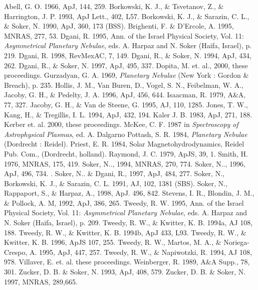 \begin{references}
 Abell, G. O. 1966, ApJ, 144, 259.
 Borkowski, K. J., \& Tsvetanov, Z., \& Harrington, J. P. 1993,
ApJ Lett., 402, L57.
 Borkowski, K. J., \& Sarazin, C. L., \& Soker, N. 1990,
ApJ, 360, 173 (BSS).
 Brighenti, F. \& D'Ercole, A. 1995, MNRAS, 277, 53.
 Dgani, R. 1995,
Ann. of the Israel Physical Society, Vol. 11:
{\it Asymmetrical Planetary Nebulae},
eds. A. Harpaz and N. Soker (Haifa, Israel), p. 219.
 Dgani, R. 1998, RevMexAC, 7, 149.
 Dgani, R.,  \& Soker, N. 1994, ApJ, 434, 262.
 Dgani, R.,  \& Soker, N. 1997, ApJ, 495, 337.
 Dopita, M. et. al., 2000, these proceedings.
 Gurzadyan, G. A. 1969, {\it Planetary Nebulae} 
(New York : Gordon \& Breach), p. 235.
 Hollis, J. M., Van Buren, D., Vogel, S. N., Feibelman, W. A.,
     Jacoby, G. H., \& Pedelty, J. A. 1996, ApJ, 456, 644.
 Isaacman,  R. 1979, A\&A, 77, 327.
 Jacoby, G. H., \& Van de Steene, G. 1995, AJ, 110, 1285.
 Jones, T. W., Kang, H., \& Tregillis, I. L. 1994,
ApJ, 432, 194.
 Kaler J. B. 1983, ApJ, 271, 188.
 Kerber et. al. 2000, these proceedings.
 McKee, C. F. 1987 in {\it Spectroscopy of Astrophysical
 Plasmas}, ed. A. Dalgarno
 Pottash, S. R. 1984,  {\it Planetary Nebulae} (Dordrecht : Reidel).
 Priest, E. R. 1984, Solar Magnetohydrodynamics,
Reidel Pub. Com., (Dordrecht, holland).
 Raymond,  J. C.  1979, ApJS, 39, 1.
 Smith, H.  1976, MNRAS, 175, 419.
 Soker, N.., 1994, MNRAS, 270, 774.
 Soker, N.., 1996, ApJ, 496, 734. .
 Soker, N.. \&   Dgani, R., 1997, ApJ, 484, 277.
 Soker, N., Borkowski, K. J., \& Sarazin, C. L. 1991, AJ, 102, 1381 (SBS).
 Soker, N., Rappaport, S., \& Harpaz, A., 1998, ApJ. 496, 842.
 Stevens, I. R., Blondin, J. M., \& Pollock, A. M, 1992, ApJ, 386, 265.
 Tweedy, R. W. 1995,
Ann. of the Israel Physical Society, Vol. 11:
{\it Asymmetrical Planetary Nebulae},
eds. A. Harpaz and N. Soker (Haifa, Israel), p. 209.
 Tweedy, R. W., \& Kwitter, K. B. 1994a, AJ 108, 188.
 Tweedy, R. W., \& Kwitter, K. B. 1994b, ApJ 433, L93.
 Tweedy, R. W., \& Kwitter, K. B. 1996, ApJS 107, 255.
 Tweedy, R. W., Martos, M. A., \& Noriega-Crespo, A. 1995,
ApJ, 447, 257.
 Tweedy, R. W., \& Napiwotzki, R. 1994, AJ 108, 978.
 Villaver, E. et. al. these proceedings.
 Weinberger, R.  1989, A\&A Supp., 78, 301.
 Zucker, D. B. \& Soker, N. 1993, ApJ, 408, 579.
 Zucker, D. B. \& Soker, N. 1997, MNRAS, 289,665.
\end{references}



